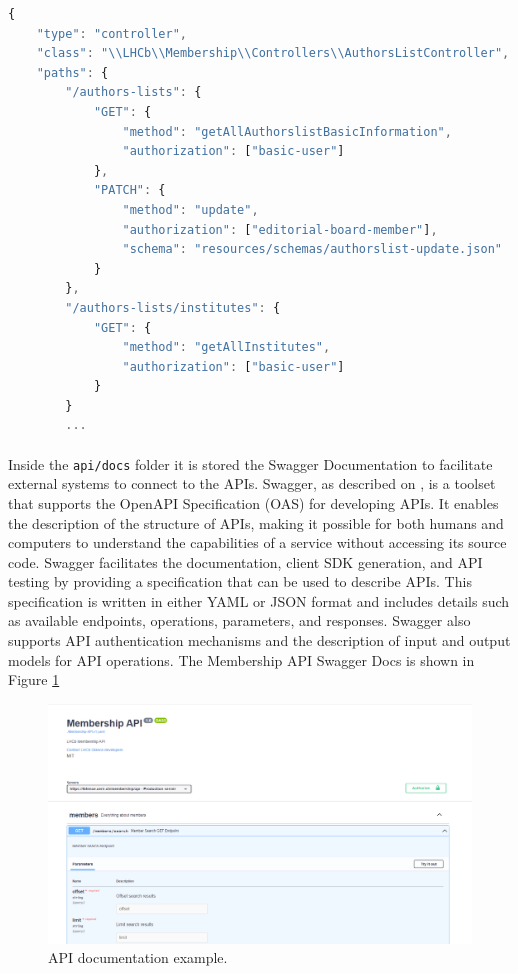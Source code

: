 \begin{lstlisting}[language=javascript, caption=authors list resource routes., label=lst:AuthorsListRoute]
{
    "type": "controller",
    "class": "\\LHCb\\Membership\\Controllers\\AuthorsListController",
    "paths": {
        "/authors-lists": {
            "GET": {
                "method": "getAllAuthorslistBasicInformation",
                "authorization": ["basic-user"]
            },
            "PATCH": {
                "method": "update",
                "authorization": ["editorial-board-member"],
                "schema": "resources/schemas/authorslist-update.json"
            }
        },
        "/authors-lists/institutes": {
            "GET": {
                "method": "getAllInstitutes",
                "authorization": ["basic-user"]
            }
        }
        ...
\end{lstlisting}

\paragraph{} Inside the \verb|api/docs| folder it is stored the Swagger Documentation to facilitate external systems to connect to the APIs. Swagger, as described on \cite{SwaggerDocs}, is a toolset that supports the OpenAPI Specification (OAS) for developing APIs. It enables the description of the structure of APIs, making it possible for both humans and computers to understand the capabilities of a service without accessing its source code. Swagger facilitates the documentation, client SDK generation, and API testing by providing a specification that can be used to describe APIs. This specification is written in either YAML or JSON format and includes details such as available endpoints, operations, parameters, and responses. Swagger also supports API authentication mechanisms and the description of input and output models for API operations. The Membership API Swagger Docs is shown in Figure \ref{fig:swagger}

\begin{figure}[H]
    \centering
    \includegraphics[width=0.8\linewidth]{figuras/swagger.png}
    \caption{API documentation example.}
    \label{fig:swagger}
\end{figure}


